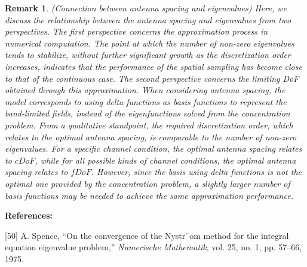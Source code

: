 \documentclass[a4paper,12pt]{article}
\newtheorem{remark}{\bf Remark}
\begin{document}
\begin{framed}
	{\color{red}
		\setcounter{remark}{10} 
		\begin{remark}
			(Connection between antenna spacing and eigenvalues) Here, we discuss the relationship between the antenna spacing and eigenvalues from two perspectives. The first perspective concerns the approximation process in numerical computation. The point at which the number of non-zero eigenvalues tends to stabilize, without further significant growth as the discretization order increases, indicates that the performance of the spatial sampling has become close to that of the continuous case. The second perspective concerns the limiting DoF obtained through this approximation. When considering antenna spacing, the model corresponds to using delta functions as basis functions to represent the band-limited fields, instead of the eigenfunctions solved from the concentration problem. From a qualitative standpoint, the required discretization order, which relates to the optimal antenna spacing, is comparable to the number of non-zero eigenvalues. For a specific channel condition, the optimal antenna spacing relates to $cDoF$, while for all possible kinds of channel conditions, the optimal antenna spacing relates to $fDoF$. 
			However, since the basis using delta functions is not the optimal one provided by the concentration problem, a slightly larger number of basis functions may be needed to achieve the same approximation performance. 
			
		\end{remark}
	}
	
\end{framed}

{\color{blue}
	{\bf References:}
	
	[50] A. Spence, “On the convergence of the Nystr¨om method for the integral equation eigenvalue problem,” {\it Numerische Mathematik},
	vol. 25, no. 1, pp. 57–66, 1975.
	
}


{}


\clearpage 
\end{document}
